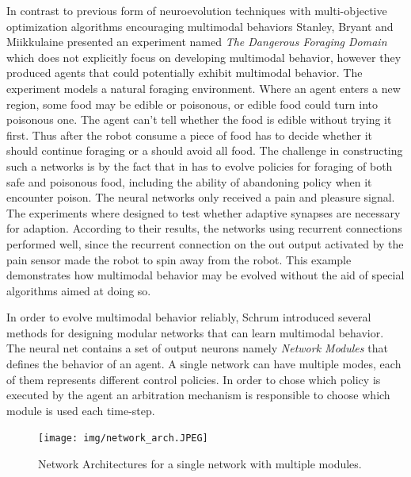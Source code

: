 \documentclass[format=acmsmall, review=false, screen=true]{acmart}
\begin{document}
In contrast to previous form of neuroevolution techniques with multi-objective optimization algorithms encouraging multimodal behaviors Stanley, Bryant and Miikkulaine presented an experiment named \emph{The Dangerous Foraging Domain}\cite{stanley2003evolving} which does not explicitly focus on developing multimodal behavior, however they produced agents that could potentially exhibit multimodal behavior. The experiment models a natural foraging environment. Where an agent enters a new region, some food may be edible or poisonous, or edible food could turn into poisonous one. The agent can't tell whether the food is edible without trying it first. Thus after the robot consume a piece of food has to decide whether it should continue foraging or a should avoid all food. The challenge in constructing such a networks is by the fact that in has to evolve policies for foraging of both safe and poisonous food, including the ability of abandoning policy when it encounter poison. The neural networks only received a pain and pleasure signal. The experiments where designed to test whether adaptive synapses are necessary for adaption. According to their results, the networks using recurrent connections performed well, since the recurrent connection on the out output activated by the pain sensor made the robot to spin away from the robot. This example demonstrates how multimodal behavior may be evolved without the aid of special algorithms aimed at doing so.

In order to evolve multimodal behavior reliably, Schrum \cite{schrum2014evolving} introduced several methods for designing modular networks that can learn multimodal behavior. The neural net contains a set of output neurons namely \emph{Network Modules} that defines the behavior of an agent. A single network can have multiple modes, each of them represents different control policies. In order to chose which policy is executed by the agent an arbitration mechanism is responsible to choose which module is used each time-step.

\begin{figure}[H]
  \texttt{[image: img/network\_arch.JPEG]}
  \caption{\label{fig:paretofront}Network Architectures for a single network with multiple modules.}
\end{figure}
\end{document}
